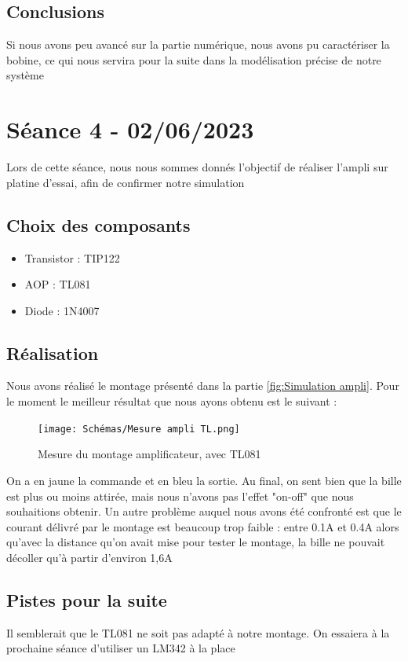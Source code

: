 \documentclass[11pt,a4paper]{article}
\begin{document}
\subsection{Conclusions}
Si nous avons peu avancé sur la partie numérique, nous avons pu caractériser la bobine, ce qui nous servira pour la suite dans la modélisation précise de notre système

\section{Séance 4 - 02/06/2023}
Lors de cette séance, nous nous sommes donnés l'objectif de réaliser l'ampli sur platine d'essai, afin de confirmer notre simulation

\subsection{Choix des composants}
\begin{itemize}
\item Transistor : TIP122
\item AOP : TL081
\item Diode : 1N4007
\end{itemize}

\subsection{Réalisation}
Nous avons réalisé le montage présenté dans la partie \ref{fig:Simulation ampli}. Pour le moment le meilleur résultat que nous ayons obtenu est le suivant :
\begin{figure} [H]
\begin{center}
\texttt{[image: Schémas/Mesure ampli TL.png]} 
\end{center}
\caption{Mesure du montage amplificateur, avec TL081}
\end{figure}

On a en jaune la commande et en bleu la sortie. Au final, on sent bien que la bille est plus ou moins attirée, mais nous n'avons pas l'effet "on-off" que nous souhaitions obtenir.
Un autre problème auquel nous avons été confronté est que le courant délivré par le montage est beaucoup trop faible : entre 0.1A et 0.4A alors qu'avec la distance qu'on avait mise pour tester le montage, la bille ne pouvait décoller qu'à partir d'environ 1,6A

\subsection{Pistes pour la suite}
Il semblerait que le TL081 ne soit pas adapté à notre montage. On essaiera à la prochaine séance d'utiliser un LM342 à la place
\end{document}
